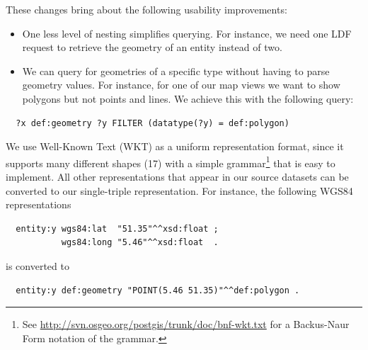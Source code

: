 \documentclass[a4paper]{scrartcl}
\begin{document}
These changes bring about the following usability improvements:

\begin{itemize}
  
\item One less level of nesting simplifies querying.  For instance, we
  need one LDF request to retrieve the geometry of an entity instead
  of two.

\item We can query for geometries of a specific type without having to
  parse geometry values.  For instance, for one of our map views we
  want to show polygons but not points and lines.  We achieve this
  with the following query:

\end{itemize}

\begin{verbatim}
  ?x def:geometry ?y FILTER (datatype(?y) = def:polygon)
\end{verbatim}

We use Well-Known Text (WKT) as a uniform representation format, since
it supports many different shapes (17) with a simple
grammar\footnote{See
  \url{http://svn.osgeo.org/postgis/trunk/doc/bnf-wkt.txt} for a
  Backus-Naur Form notation of the grammar.} that is easy to
implement.  All other representations that appear in our source datasets can be converted to our single-triple representation.  For instance, the following WGS84 representations

\begin{verbatim}
  entity:y wgs84:lat  "51.35"^^xsd:float ;
           wgs84:long "5.46"^^xsd:float  .
\end{verbatim}

is converted to

\begin{verbatim}
  entity:y def:geometry "POINT(5.46 51.35)"^^def:polygon .
\end{verbatim} 

\end{document}
